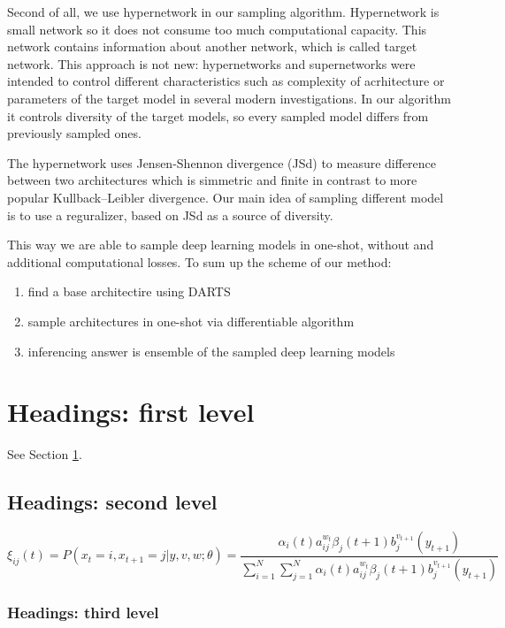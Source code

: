 \documentclass{article}
\begin{document}
Second of all, we use hypernetwork in our sampling algorithm. Hypernetwork is small network so it does not
consume too much computational capacity. This network contains information about another network, which is called target network.
This approach is not new: hypernetworks and supernetworks were intended to control different characteristics such as
complexity of acrhitecture or parameters of the target model in several modern investigations. In our algorithm it controls 
diversity of the target models, so every sampled model differs from previously sampled ones.

The hypernetwork uses Jensen-Shennon divergence (JSd) to measure difference between two architectures which is simmetric and finite
in contrast to more popular Kullback–Leibler divergence. Our main idea of sampling different model is to use a reguralizer,
based on JSd as a source of diversity.

This way we are able to sample deep learning models in one-shot, without and additional computational losses.
To sum up the scheme of our method:
\begin{enumerate} 
    \item find a base architectire using DARTS
    \item sample architectures in one-shot via differentiable algorithm
    \item inferencing answer is ensemble of the sampled deep learning models
\end{enumerate}


\section{Headings: first level}
\label{sec:headings}

\lipsum[4] See Section \ref{sec:headings}.

\subsection{Headings: second level}
\lipsum[5]
\begin{equation}
	\xi _{ij}(t)=P(x_{t}=i,x_{t+1}=j|y,v,w;\theta)= {\frac {\alpha _{i}(t)a^{w_t}_{ij}\beta _{j}(t+1)b^{v_{t+1}}_{j}(y_{t+1})}{\sum _{i=1}^{N} \sum _{j=1}^{N} \alpha _{i}(t)a^{w_t}_{ij}\beta _{j}(t+1)b^{v_{t+1}}_{j}(y_{t+1})}}
\end{equation}

\subsubsection{Headings: third level}
\lipsum[6]
\end{document}

